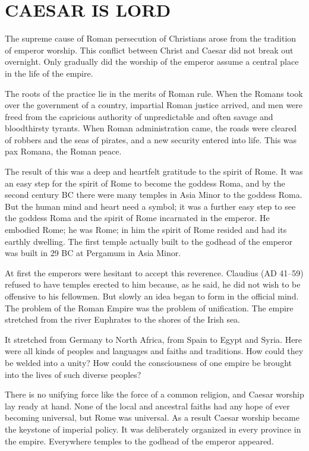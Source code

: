 \section{CAESAR IS LORD}

The supreme cause of Roman persecution of Christians arose from the tradition of emperor worship.
This conflict between Christ and Caesar did not break out overnight. Only gradually did the worship
of the emperor assume a central place in the life of the empire.

The roots of the practice lie in the merits of Roman rule. When the Romans took over the government
of a country, impartial Roman justice arrived, and men were freed from the capricious authority of
unpredictable and often savage and bloodthirsty tyrants. When Roman administration came, the roads
were cleared of robbers and the seas of pirates, and a new security entered into life. This was pax
Romana, the Roman peace.

The result of this was a deep and heartfelt gratitude to the spirit of Rome. It was an easy step for
the spirit of Rome to become the goddess Roma, and by the second century BC there were many temples
in Asia Minor to the goddess Roma. But the human mind and heart need a symbol; it was a further easy
step to see the goddess Roma and the spirit of Rome incarnated in the emperor. He embodied Rome; he
was Rome; in him the spirit of Rome resided and had its earthly dwelling. The first temple actually
built to the godhead of the emperor was built in 29 BC at Pergamum in Asia Minor.

At first the emperors were hesitant to accept this reverence. Claudius (AD 41–59) refused to have
temples erected to him because, as he said, he did not wish to be offensive to his fellowmen. But
slowly an idea began to form in the official mind. The problem of the Roman Empire was the problem
of unification. The empire stretched from the river Euphrates to the shores of the Irish sea.

It stretched from Germany to North Africa, from Spain to Egypt and Syria. Here were all kinds of
peoples and languages and faiths and traditions. How could they be welded into a unity? How could
the consciousness of one empire be brought into the lives of such diverse peoples?

There is no unifying force like the force of a common religion, and Caesar worship lay ready at
hand. None of the local and ancestral faiths had any hope of ever becoming universal, but Rome was
universal. As a result Caesar worship became the keystone of imperial policy. It was deliberately
organized in every province in the empire. Everywhere temples to the godhead of the emperor
appeared.

